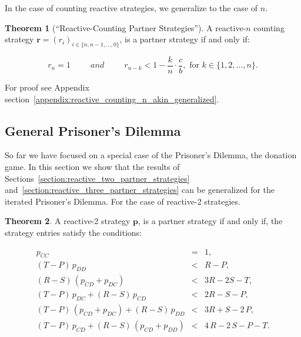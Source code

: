 \documentclass{article}
\theoremstyle{definition}
\newtheorem{theorem}{Theorem}[section]
\begin{document}
In the case of counting reactive strategies, we generalize to the case of $n$.

\begin{theorem}[``Reactive-Counting Partner Strategies'']\label{theorem:reactive_counting_partner_strategies}
A reactive-$n$ counting strategy $\mathbf{r}=(r_i)_{i \in \{n, n-1, \dots, 0\}}$,
is a partner strategy if and only if:

\begin{equation}
  r_n = 1 \qquad ~~and~~ \qquad r_{n - k} < 1 - \frac{k}{n} \cdot \frac{c}{b}, \text{ for } k \in \{1, 2, \dots, n\}.
\end{equation}

For proof see Appendix section~\ref{appendix:reactive_counting_n_akin_generalized}.

\end{theorem}


\subsection{General Prisoner's Dilemma}\label{section:general_prisoners_dilemma}

So far we have focused on a special case of the Prisoner's Dilemma, the donation
game. In this section we show that the results of Sections~\ref{section:reactive_two_partner_strategies}
and~\ref{section:reactive_three_partner_strategies} can be generalized
for the iterated Prisoner's Dilemma. For the case of reactive-2 strategies.


\begin{theorem}\label{theorem:reactive_two_partner_strategies_PD}
A reactive-2 strategy $\mathbf{p}$, is a partner strategy if and only if,
the strategy entries satisfy the conditions:

\begin{equation*}
  \begin{array}{ccc}
    p_{CC} & = & 1, \\ [0.2cm]
    (T - P)\, p_{DD} & < & R - P, \\ [0.2cm]
    (R - S)\, (p_{CD} + p_{DC}) & < & 3 R - 2 S - T, \\ [0.2cm]
    (T - P)\, p_{DC}  + (R - S)\, p_{CD} & < & 2 R - S - P, \\ [0.2cm]
    (T - P)\, (p_{CD} + p_{DC}) + (R - S)\, p_{DD}  & < & 3 R + S - 2\,P, \\ [0.2cm]
    (T - P)\, p_{CD}  + (R - S)\, (p_{CD} + p_{DD}) & < & 4\,R - 2\,S - P - T.
\end{array}
\end{equation*}
\end{theorem}
\end{document}
